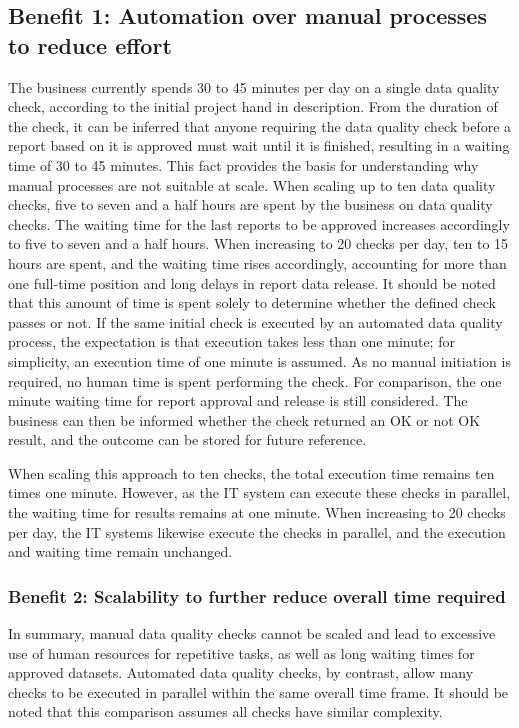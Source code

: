 \subsection*{Benefit 1: Automation over manual processes to reduce effort}
\label{SolutionReasonsAutomationOverManual}
The business currently spends 30 to 45 minutes per day on a single data quality check, according to the initial project hand in description. From the duration of the check, it can be inferred that anyone requiring the data quality check before a report based on it is approved must wait until it is finished, resulting in a waiting time of 30 to 45 minutes. This fact provides the basis for understanding why manual processes are not suitable at scale. When scaling up to ten data quality checks, five to seven and a half hours are spent by the business on data quality checks. The waiting time for the last reports to be approved increases accordingly to five to seven and a half hours. When increasing to 20 checks per day, ten to 15 hours are spent, and the waiting time rises accordingly, accounting for more than one full-time position and long delays in report data release. It should be noted that this amount of time is spent solely to determine whether the defined check passes or not.
If the same initial check is executed by an automated data quality process, the expectation is that execution takes less than one minute; for simplicity, an execution time of one minute is assumed. As no manual initiation is required, no human time is spent performing the check. For comparison, the one minute waiting time for report approval and release is still considered. The business can then be informed whether the check returned an OK or not OK result, and the outcome can be stored for future reference.

When scaling this approach to ten checks, the total execution time remains ten times one minute. However, as the IT system can execute these checks in parallel, the waiting time for results remains at one minute. When increasing to 20 checks per day, the IT systems likewise execute the checks in parallel, and the execution and waiting time remain unchanged.

\subsubsection*{Benefit 2: Scalability to further reduce overall time required}
In summary, manual data quality checks cannot be scaled and lead to excessive use of human resources for repetitive tasks, as well as long waiting times for approved datasets. Automated data quality checks, by contrast, allow many checks to be executed in parallel within the same overall time frame. It should be noted that this comparison assumes all checks have similar complexity.

